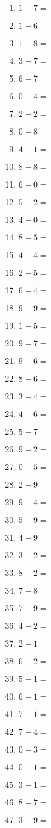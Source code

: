 \documentclass{article}
\begin{document}
\begin{multicols}{5}
\begin{enumerate}
\item $1 - 7 =$
\item $1 - 6 =$
\item $1 - 8 =$
\item $3 - 7 =$
\item $6 - 7 =$
\item $0 - 4 =$
\item $2 - 2 =$
\item $0 - 8 =$
\item $4 - 1 =$
\item $8 - 8 =$
\item $6 - 0 =$
\item $5 - 2 =$
\item $4 - 0 =$
\item $8 - 5 =$
\item $4 - 4 =$
\item $2 - 5 =$
\item $6 - 4 =$
\item $9 - 9 =$
\item $1 - 5 =$
\item $9 - 7 =$
\item $9 - 6 =$
\item $8 - 6 =$
\item $3 - 4 =$
\item $4 - 6 =$
\item $5 - 7 =$
\item $9 - 2 =$
\item $0 - 5 =$
\item $2 - 9 =$
\item $9 - 4 =$
\item $5 - 9 =$
\item $4 - 9 =$
\item $3 - 2 =$
\item $8 - 2 =$
\item $7 - 8 =$
\item $7 - 9 =$
\item $4 - 2 =$
\item $2 - 1 =$
\item $6 - 2 =$
\item $5 - 1 =$
\item $6 - 1 =$
\item $7 - 1 =$
\item $7 - 4 =$
\item $0 - 3 =$
\item $0 - 1 =$
\item $3 - 1 =$
\item $8 - 7 =$
\item $3 - 9 =$

\end{enumerate}
\end{multicols}
\end{document}
